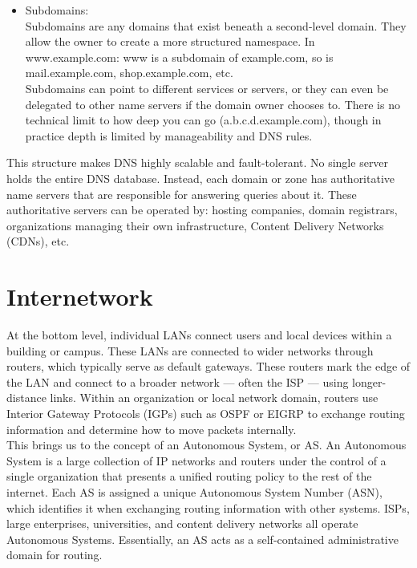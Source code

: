 \documentclass{article}
\begin{document}
\begin{itemize}
		\item Subdomains:\\
			Subdomains are any domains that exist beneath a second-level domain. They allow the owner to create a more structured namespace. In www.example.com: www is a subdomain of example.com, so is mail.example.com, shop.example.com, etc.\\

			Subdomains can point to different services or servers, or they can even be delegated to other name servers if the domain owner chooses to. There is no technical limit to how deep you can go (a.b.c.d.example.com), though in practice depth is limited by manageability and DNS rules.
	\end{itemize}

This structure makes DNS highly scalable and fault-tolerant. No single server holds the entire DNS database. Instead, each domain or zone has authoritative name servers that are responsible for answering queries about it. These authoritative servers can be operated by: hosting companies, domain registrars, organizations managing their own infrastructure, Content Delivery Networks (CDNs), etc.

\section*{Internetwork}
At the bottom level, individual LANs connect users and local devices within a building or campus. These LANs are connected to wider networks through routers, which typically serve as default gateways. These routers mark the edge of the LAN and connect to a broader network — often the ISP — using longer-distance links. Within an organization or local network domain, routers use Interior Gateway Protocols (IGPs) such as OSPF or EIGRP to exchange routing information and determine how to move packets internally.\\

This brings us to the concept of an Autonomous System, or AS. An Autonomous System is a large collection of IP networks and routers under the control of a single organization that presents a unified routing policy to the rest of the internet. Each AS is assigned a unique Autonomous System Number (ASN), which identifies it when exchanging routing information with other systems. ISPs, large enterprises, universities, and content delivery networks all operate Autonomous Systems. Essentially, an AS acts as a self-contained administrative domain for routing.\\
\end{document}
